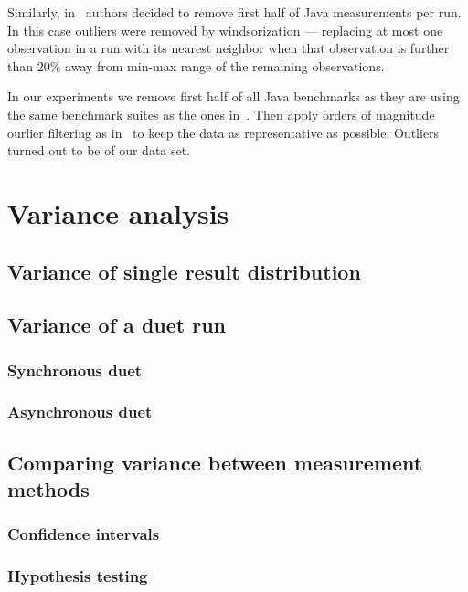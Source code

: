 Similarly, in~\citet{bulej2020duet} authors decided to remove first half of Java measurements per run.
In this case outliers were removed by windsorization --- replacing at most one observation in a run with its nearest neighbor when that observation is further than $20\%$ away from min-max range of the remaining observations.

In our experiments we remove first half of all Java benchmarks as they are using the same benchmark suites as the ones in~\citet{bulej2020duet}.
Then apply orders of magnitude ourlier filtering as in~\citet{laaber2019software} to keep the data as representative as possible.
Outliers turned out to be  of our data set.

\section{Variance analysis}


\subsection{Variance of single result distribution}

\subsection{Variance of a duet run}

\subsubsection{Synchronous duet}

\subsubsection{Asynchronous duet}

\subsection{Comparing variance between measurement methods}

\subsubsection{Confidence intervals}

\subsubsection{Hypothesis testing}

